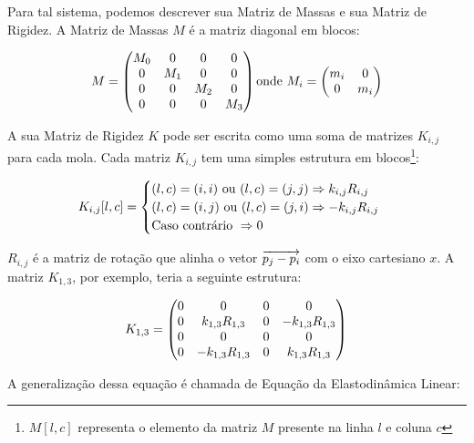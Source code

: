 Para tal sistema, podemos descrever sua Matriz de Massas e sua Matriz de Rigidez. A Matriz de Massas $M$ é a matriz diagonal em blocos:

\begin{equation}
	M = \begin{pmatrix}
		M_0 & 0 & 0 & 0\\
		0 & M_1 & 0 & 0\\
		0 & 0 & M_2 & 0\\
		0 & 0 & 0 & M_3 
	\end{pmatrix}\\
	\text{onde }
	M_i = \begin{pmatrix}
		m_i & 0\\
		0 & m_i
	\end{pmatrix}
\end{equation}

A sua Matriz de Rigidez $K$ pode ser escrita como uma soma de matrizes $K_{i,j}$ para cada mola. Cada matriz $K_{i,j}$ tem uma simples estrutura em blocos\footnote{$M[l, c]$ representa o elemento da matriz $M$ presente na linha $l$ e coluna $c$}:

\begin{equation}
K_{i,j}[l, c] = \begin{cases}
	(l, c) = (i, i) \text{ ou } (l, c) = (j, j) \Rightarrow k_{i,j}R_{i,j} \\
	(l, c) = (i, j) \text{ ou } (l, c) = (j, i) \Rightarrow -k_{i,j}R_{i,j} \\
	\text{Caso contrário } \Rightarrow 0 \\
	\end{cases}\\
\end{equation}

$R_{i,j}$ é a matriz de rotação que alinha o vetor $\overrightarrow{p_j-p_i}$ com o eixo cartesiano $x$. A matriz $K_{1,3}$, por exemplo, teria a seguinte estrutura:

\begin{equation}
	K_{1,3} = \begin{pmatrix}
		0 & 0 & 0 & 0\\
		0 & k_{1,3}R_{1,3} & 0 & -k_{1,3}R_{1,3}\\
		0 & 0 & 0 & 0\\
		0 & -k_{1,3}R_{1,3} & 0 & k_{1,3}R_{1,3}
	\end{pmatrix}\\
\end{equation}

A generalização dessa equação é chamada de Equação da Elastodinâmica Linear: 

